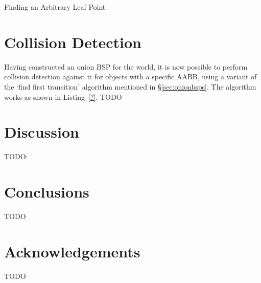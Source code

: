 \documentclass[10pt,twocolumn]{article}
\begin{document}
\begin{stulisting}[!t]
\caption{Finding an Arbitrary Leaf Point}
\label{code:arbitrary-leaf-point}

\end{stulisting}

\section{Collision Detection}
\label{sec:collisiondetection}

Having constructed an onion BSP for the world, it is now possible to perform collision detection against it for objects with a specific AABB, using a variant of the `find first transition' algorithm mentioned in \S\ref{sec:onionbsps}. The algorithm works as shown in Listing~\ref{?}. TODO

\section{Discussion}
\label{sec:discussion}

TODO: \cite{melax00}

\section{Conclusions}
\label{sec:conclusions}

TODO

\section{Acknowledgements}

TODO

%
%





\end{document}
